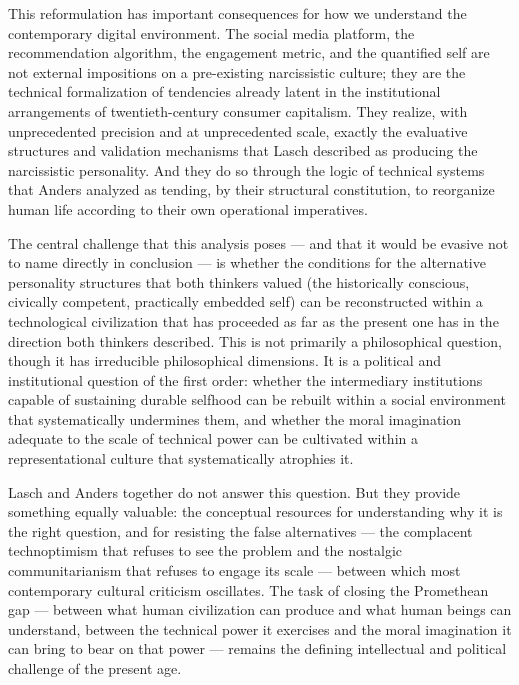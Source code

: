 \documentclass[12pt]{memoir}
\begin{document}
This reformulation has important consequences for how we understand the contemporary digital
environment. The social media platform, the recommendation algorithm, the engagement metric,
and the quantified self are not external impositions on a pre-existing narcissistic culture;
they are the technical formalization of tendencies already latent in the institutional
arrangements of twentieth-century consumer capitalism. They realize, with unprecedented
precision and at unprecedented scale, exactly the evaluative structures and validation
mechanisms that Lasch described as producing the narcissistic personality. And they do so
through the logic of technical systems that Anders analyzed as tending, by their structural
constitution, to reorganize human life according to their own operational imperatives.

The central challenge that this analysis poses — and that it would be evasive not to name
directly in conclusion — is whether the conditions for the alternative personality structures
that both thinkers valued (the historically conscious, civically competent, practically
embedded self) can be reconstructed within a technological civilization that has proceeded as
far as the present one has in the direction both thinkers described. This is not primarily a
philosophical question, though it has irreducible philosophical dimensions. It is a political
and institutional question of the first order: whether the intermediary institutions capable
of sustaining durable selfhood can be rebuilt within a social environment that systematically
undermines them, and whether the moral imagination adequate to the scale of technical power
can be cultivated within a representational culture that systematically atrophies it.

Lasch and Anders together do not answer this question. But they provide something equally
valuable: the conceptual resources for understanding why it is the right question, and for
resisting the false alternatives — the complacent technoptimism that refuses to see the problem
and the nostalgic communitarianism that refuses to engage its scale — between which most
contemporary cultural criticism oscillates. The task of closing the Promethean gap — between
what human civilization can produce and what human beings can understand, between the technical
power it exercises and the moral imagination it can bring to bear on that power — remains the
defining intellectual and political challenge of the present age.

\newpage

\end{document}
